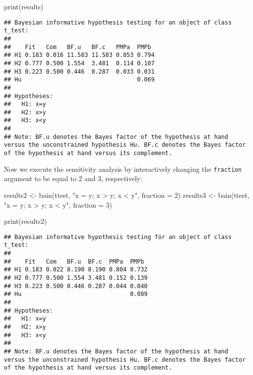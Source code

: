 \documentclass[
]{book}
\newenvironment{Shaded}{\begin{snugshade}}{\end{snugshade}}
\newcommand{\AttributeTok}[1]{\textcolor[rgb]{0.77,0.63,0.00}{#1}}
\newcommand{\DecValTok}[1]{\textcolor[rgb]{0.00,0.00,0.81}{#1}}
\newcommand{\FunctionTok}[1]{\textcolor[rgb]{0.00,0.00,0.00}{#1}}
\newcommand{\NormalTok}[1]{#1}
\newcommand{\OtherTok}[1]{\textcolor[rgb]{0.56,0.35,0.01}{#1}}
\newcommand{\StringTok}[1]{\textcolor[rgb]{0.31,0.60,0.02}{#1}}
\begin{document}
\begin{Shaded}
\begin{Highlighting}[]
\FunctionTok{print}\NormalTok{(results)}
\end{Highlighting}
\end{Shaded}

\begin{verbatim}
## Bayesian informative hypothesis testing for an object of class t_test:
## 
##    Fit   Com   BF.u   BF.c   PMPa  PMPb 
## H1 0.183 0.016 11.583 11.583 0.853 0.794
## H2 0.777 0.500 1.554  3.481  0.114 0.107
## H3 0.223 0.500 0.446  0.287  0.033 0.031
## Hu                                 0.069
## 
## Hypotheses:
##   H1: x=y
##   H2: x>y
##   H3: x<y
## 
## Note: BF.u denotes the Bayes factor of the hypothesis at hand versus the unconstrained hypothesis Hu. BF.c denotes the Bayes factor of the hypothesis at hand versus its complement.
\end{verbatim}

Now we execute the sensitivity analysis by interactively changing the \texttt{fraction} argument to be equal to 2 and 3, respectively:

\begin{Shaded}
\begin{Highlighting}[]
\NormalTok{results2 }\OtherTok{\textless{}{-}} \FunctionTok{bain}\NormalTok{(ttest, }\StringTok{"x = y; x \textgreater{} y; x \textless{} y"}\NormalTok{, }\AttributeTok{fraction =} \DecValTok{2}\NormalTok{)}
\NormalTok{results3 }\OtherTok{\textless{}{-}} \FunctionTok{bain}\NormalTok{(ttest, }\StringTok{"x = y; x \textgreater{} y; x \textless{} y"}\NormalTok{, }\AttributeTok{fraction =} \DecValTok{3}\NormalTok{)}
\end{Highlighting}
\end{Shaded}

\begin{Shaded}
\begin{Highlighting}[]
\FunctionTok{print}\NormalTok{(results2)}
\end{Highlighting}
\end{Shaded}

\begin{verbatim}
## Bayesian informative hypothesis testing for an object of class t_test:
## 
##    Fit   Com   BF.u  BF.c  PMPa  PMPb 
## H1 0.183 0.022 8.190 8.190 0.804 0.732
## H2 0.777 0.500 1.554 3.481 0.152 0.139
## H3 0.223 0.500 0.446 0.287 0.044 0.040
## Hu                               0.089
## 
## Hypotheses:
##   H1: x=y
##   H2: x>y
##   H3: x<y
## 
## Note: BF.u denotes the Bayes factor of the hypothesis at hand versus the unconstrained hypothesis Hu. BF.c denotes the Bayes factor of the hypothesis at hand versus its complement.
\end{verbatim}
\end{document}
